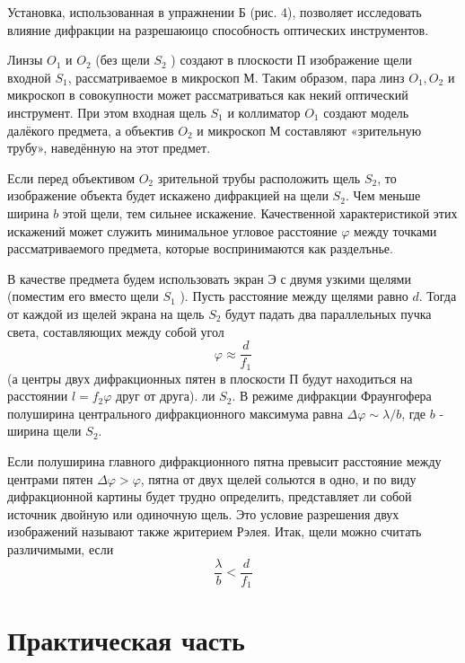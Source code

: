 \documentclass[a4paper, 12pt]{article}
\begin{document}
Установка, использованная в упражнении Б (рис. 4), позволяет исследовать влияние дифракции на разрешаюицо способность оптических инструментов.

Линзы $O_1$ и $O_2$ (без щели $S_2$ ) создают в плоскости П изображение щели входной $S_1$, рассматриваемое в микроскоп М. Таким образом, пара линз $O_1, O_2$ и микроскоп в совокупности может рассматриваться как некий оптический инструмент. При этом входная щель $S_1$ и коллиматор $O_1$ создают модель далёкого предмета, а объектив $O_2$ и микроскоп М составляют «зрительную трубу», наведённую на этот предмет.

Если перед объективом $O_2$ зрительной трубы расположить щель $S_2$, то изображение объекта будет искажено дифракцией на щели $S_2$. Чем меньше ширина $b$ этой щели, тем сильнее искажение. Качественной характеристикой этих искажений может служить минимальное угловое расстояние $\varphi$ между точками рассматриваемого предмета, которые воспринимаются как разделънье.

В качестве предмета будем использовать экран $\text{Э}$ с двумя узкими щелями (поместим его вместо щели $S_1$ ). Пусть расстояние между щелями равно $d$. Тогда от каждой из щелей экрана на щель $S_2$ будут падать два параллельных пучка света, составляющих между собой угол
\begin{equation*}
\varphi \approx \frac{d}{f_1}
\end{equation*}
(а центры двух дифракционных пятен в плоскости П будут находиться на расстоянии $l=f_2 \varphi$ друг от друга). ли $S_2$. В режиме дифракции Фраунгофера полуширина центрального дифракционного максимума равна $\Delta \varphi \sim \lambda / b$, где $b$ - ширина щели $S_2$.

Если полуширина главного дифракционного пятна превысит расстояние между центрами пятен $\Delta \varphi>\varphi$, пятна от двух щелей сольются в одно, и по виду дифракционной картины будет трудно определить, представляет ли собой источник двойную или одиночную щель. Это условие разрешения двух изображений называют также жритерием Рэлея. Итак, щели можно считать различимыми, если
\begin{equation*}
\frac{\lambda}{b}<\frac{d}{f_1}
\end{equation*}




\section{Практическая часть}
\end{document}
